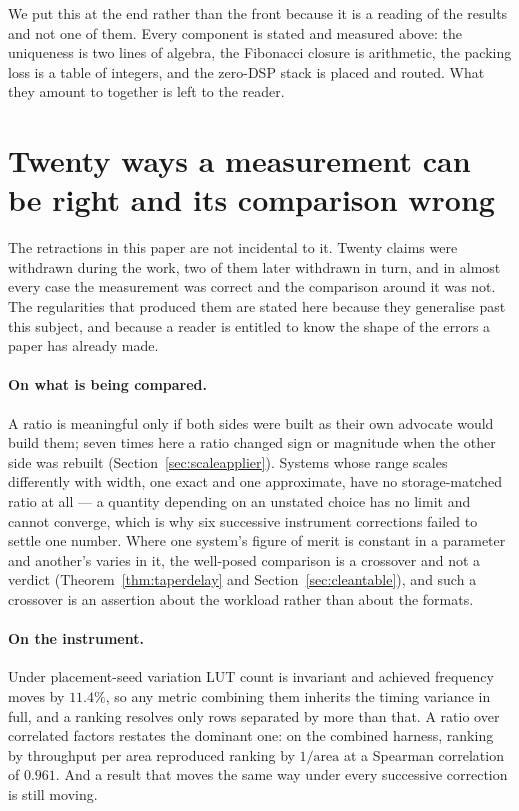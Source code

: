 \documentclass[11pt]{article}
\theoremstyle{definition}
\begin{document}
We put this at the end rather than the front because it is a reading of the
results and not one of them. Every component is stated and measured above:
the uniqueness is two lines of algebra, the Fibonacci closure is arithmetic, the
packing loss is a table of integers, and the zero-DSP stack is placed and routed.
What they amount to together is left to the reader.



\section{Twenty ways a measurement can be right and its comparison wrong}
\label{sec:selfcheck}

The retractions in this paper are not incidental to it. Twenty claims were
withdrawn during the work, two of them later withdrawn in turn, and in almost
every case the measurement was correct and the comparison around it was not. The
regularities that produced them are stated here because they generalise past this
subject, and because a reader is entitled to know the shape of the errors a paper
has already made.

\paragraph{On what is being compared.} A ratio is meaningful only if both sides
were built as their own advocate would build them; seven times here a ratio
changed sign or magnitude when the other side was rebuilt
(Section~\ref{sec:scaleapplier}). Systems whose range scales differently with
width, one exact and one approximate, have no storage-matched ratio at all --- a
quantity depending on an unstated choice has no limit and cannot converge, which
is why six successive instrument corrections failed to settle one number. Where
one system's figure of merit is constant in a parameter and another's varies in
it, the well-posed comparison is a crossover and not a verdict
(Theorem~\ref{thm:taperdelay} and Section~\ref{sec:cleantable}), and such a
crossover is an assertion about the workload rather than about the formats.

\paragraph{On the instrument.} Under placement-seed variation LUT count is
invariant and achieved frequency moves by $11.4\%$, so any metric combining them
inherits the timing variance in full, and a ranking resolves only rows separated
by more than that. A ratio over correlated factors restates the dominant one: on
the combined harness, ranking by throughput per area reproduced ranking by
$1/\text{area}$ at a Spearman correlation of $0.961$. And a result that moves the
same way under every successive correction is still moving.
\end{document}
